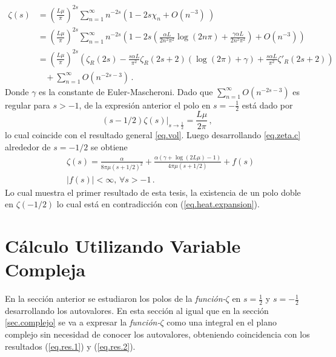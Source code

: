 \begin{align}\label{eq.zeta.c}
    \zeta  (s) &= \left( \frac{L \mu}{\pi} \right) ^{2 s}
    \sum _{n=1} ^{\infty} 
    n ^{-2s}
    \left(
    1 - 2 s \chi _n + O \left( n ^{-3} \right) \
    \right)   \nonumber \\[5pt]
     &= \left( \frac{L \mu }{\pi} \right) ^{2 s}
    \sum _{n=1} ^{\infty} n ^{-2 s} 
    \left(
    1 - 2s \left(
    \frac{\alpha L }{2 n ^2 \pi ^2} \log ( 2  n \pi) + 
    \frac{\gamma \alpha L }{2 n ^2 \pi ^2} 
	\right) +
    O \left( n ^{-3}   \right)
    \right) \nonumber \\[5pt]
    &=   \left( \frac{L \mu }{ \pi } \right) ^{2 s}  
    \left( \zeta _R (2 s) -
	\frac{ s \alpha L}{ \pi ^2} \zeta _R (2s+2)
	\left(
	    \log (2  \pi ) + \gamma
	\right) + 
    \frac{s \alpha L}{\pi ^2}
	\zeta ' _R(2s+2) \right) \nonumber \\[5pt]
	&\ \ \ \  + \sum _{n=1} ^{\infty} O \left( n ^{-2s-3} \right) \, .
\end{align}    
Donde $\gamma$ es la constante de Euler-Mascheroni.
Dado que $\sum _{n=1} ^{\infty} O \left( n ^{-2s-3} \right)$ es regular para $s > -1$, de la expresión anterior el polo en $s= - \frac{1}{2}$ está dado por
\begin{equation}\label{eq.res.2}
    ( s-1/2 ) \zeta  (s) | _{s \rightarrow \frac{1}{2}} = 
    \frac{L \mu }{2 \pi}
    	\, ,
\end{equation}
lo cual coincide con el resultado general \ref{eq.vol}. Luego desarrollando \ref{eq.zeta.c} alrededor de $s=-1/2$ se obtiene
\begin{align}\label{eq.res.1}
    &\zeta  (s) =  \frac{\alpha}{8  \pi \mu (s+1/2)^2} +
    \frac{ \alpha ( \gamma  +  \log (2L \mu ) -1 ) }{4  \pi \mu (s+1/2) }  + 
	f (s) \\
	&| f(s) | < \infty , \, \forall s > -1
    	\, .
\end{align}
Lo cual muestra el primer resultado de esta tesis, la existencia de un polo doble en $\zeta(-1/2)$ lo cual está en contradicción con (\ref{eq.heat.expansion}).

\section{Cálculo Utilizando Variable Compleja}\label{seq.2.com}


En la sección anterior se estudiaron los polos de la {\it función-$\zeta$} en $s=\frac{1}{2}$ y $s=-\frac{1}{2}$ desarrollando los autovalores.
En esta sección al igual que en la sección \ref{sec.complejo} se va a expresar la {\it función-$\zeta $} como una integral en el plano complejo sin necesidad de conocer los autovalores, obteniendo coincidencia con los resultados (\ref{eq.res.1}) y (\ref{eq.res.2}).


